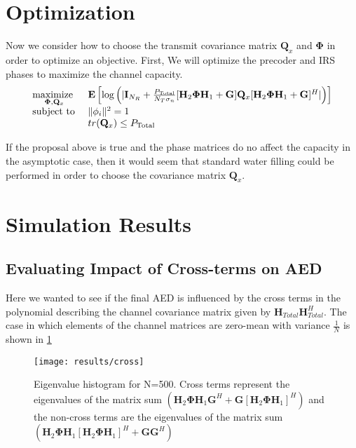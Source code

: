 \documentclass[12pt,a4paper]{report}
\begin{document}
\section{Optimization}
Now we consider how to choose the transmit covariance matrix $\mathbf{Q}_x$ and $\boldsymbol{\Phi}$ in order to optimize an objective.
First, We will optimize the precoder and IRS phases to maximize the channel capacity.
		    \begin{equation}
    \begin{array}{ll}
    \underset{\boldsymbol{\Phi}, \mathbf{Q}_x}{\text{maximize }}   & \mathop{\bf E{}}\left[\text{log{}}\left(|\mathbf{I}_{N_R}+\frac{P_{\text{Total}}}{N_T \sigma_n}[\mathbf{H}_{2}\boldsymbol{\Phi}\mathbf{H}_{1} + \mathbf{G}]\mathbf{Q}_x[\mathbf{H}_{2}\boldsymbol{\Phi}\mathbf{H}_{1} + \mathbf{G}]^H|\right)\right]
    \\
    \mbox{subject to } & \|\phi_i\|^2 = 1
    \\
    & tr(\mathbf{Q}_x) \leq P_{\text{Total}}
    \end{array}
    \label{general_irs_opt}
    \end{equation} 

If the proposal above is true and the phase matrices do no affect the capacity in the asymptotic case, then it would seem that standard water filling could be performed in order to choose the covariance matrix $\mathbf{Q}_x$.

\section{Simulation Results}

\subsection{Evaluating Impact of Cross-terms on AED}
Here we wanted to see if the final AED is influenced by the cross terms in the polynomial describing the channel
covariance matrix given by $\mathbf{H}_{Total}\mathbf{H}_{Total}^H$. The case in which elements of the channel matrices are zero-mean with variance  $\frac{1}{N}$ is shown in \ref{cross}

\begin{figure}[H]
	\texttt{[image: results/cross]}
\caption{Eigenvalue histogram for N=500. Cross terms represent the eigenvalues of the matrix sum $(\mathbf{H}_{2}\boldsymbol{\Phi}\mathbf{H}_{1}\mathbf{G}^H + \mathbf{G}[\mathbf{H}_{2}\boldsymbol{\Phi}\mathbf{H}_{1}]^H)$ and the non-cross terms are the eigenvalues of the matrix sum $(\mathbf{H}_{2}\boldsymbol{\Phi}\mathbf{H}_{1}[\mathbf{H}_{2}\boldsymbol{\Phi}\mathbf{H}_{1}]^H + \mathbf{G}\mathbf{G}^H)$}
\label{cross}
\end{figure}
\end{document}
